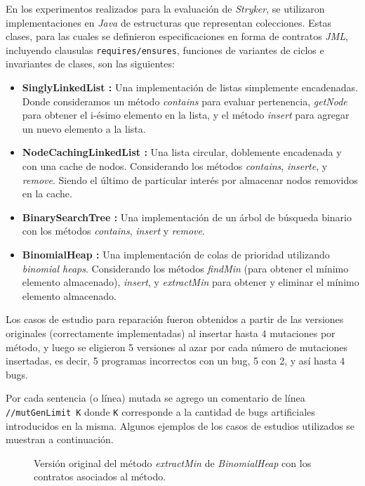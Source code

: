 En los experimentos realizados para la evaluaci\'on de \emph{Stryker}, se utilizaron implementaciones en \emph{Java} de estructuras que representan colecciones. Estas clases, para las cuales se definieron especificaciones en forma de contratos \emph{JML}, incluyendo clausulas \texttt{requires/ensures}, funciones de variantes de ciclos e invariantes de clases, son las siguientes:
\begin{itemize}
	\item \textbf{SinglyLinkedList :} Una implementaci\'on de listas simplemente encadenadas. Donde consideramos un m\'etodo \emph{contains} para evaluar pertenencia, \emph{getNode} para obtener el i-\'esimo elemento en la lista, y el m\'etodo \emph{insert} para agregar un nuevo elemento a la lista.
	
	\item \textbf{NodeCachingLinkedList :} Una lista circular, doblemente encadenada y con una cache de nodos. Considerando los m\'etodos \emph{contains}, \emph{inserte}, y \emph{remove}. Siendo el \'ultimo de particular inter\'es por almacenar nodos removidos en la cache.
	
	\item \textbf{BinarySearchTree :} Una implementaci\'on de un \'arbol de b\'usqueda binario con los m\'etodos \emph{contains}, \emph{insert} y \emph{remove}.
	
	\item \textbf{BinomialHeap :} Una implementaci\'on de colas de prioridad utilizando \emph{binomial heaps}. Considerando los m\'etodos \emph{findMin} (para obtener el m\'inimo elemento almacenado), \emph{insert}, y \emph{extractMin} para obtener y eliminar el m\'inimo elemento almacenado.
\end{itemize}

Los casos de estudio para reparaci\'on fueron obtenidos a partir de las versiones originales (correctamente implementadas) al insertar hasta $4$ mutaciones por m\'etodo, y luego se eligieron 5 versiones al azar por cada n\'umero de mutaciones insertadas, es decir, 5 programas incorrectos con un bug, 5 con 2, y as\'i hasta $4$ bugs.

Por cada sentencia (o l\'inea) mutada se agrego un comentario de l\'inea \texttt{//mutGenLimit K} donde \texttt{K} corresponde a la cantidad de bugs artificiales introducidos en la misma. Algunos ejemplos de los casos de estudios utilizados se muestran a continuaci\'on.

\begin{figure}[H]
	
	\caption{Versi\'on original del m\'etodo \emph{extractMin} de \emph{BinomialHeap} con los contratos asociados al m\'etodo.}
	\label{figures.code.repair.binheap_extractMin_orig}
\end{figure}

